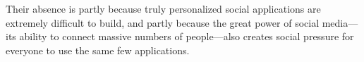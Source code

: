 Their absence is partly because truly personalized social applications
are extremely difficult to build,
and partly because the great power of social media---its
ability to connect massive numbers of people---also
creates social pressure for everyone to use the same few applications.










